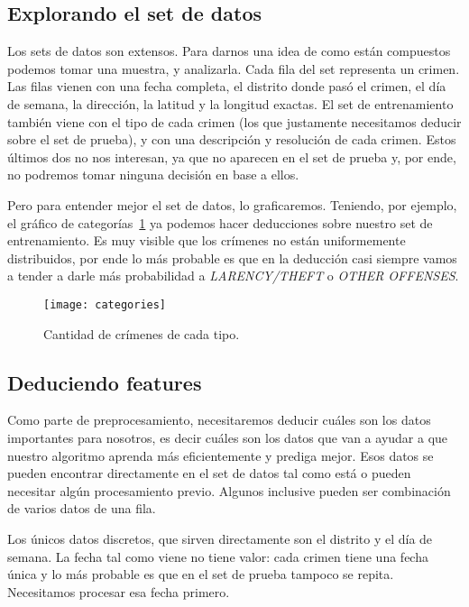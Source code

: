 \subsection{Explorando el set de datos} %
\label{sub:explorando_el_set_de_datos}

Los sets de datos son extensos. Para darnos una idea de como están compuestos podemos tomar una muestra, y analizarla. Cada fila del set representa un crimen. Las filas vienen con una fecha completa, el distrito donde pasó el crimen, el día de semana, la dirección, la latitud y la longitud exactas. El set de entrenamiento también viene con el tipo de cada crimen (los que justamente necesitamos deducir sobre el set de prueba), y con una descripción y resolución de cada crimen. Estos últimos dos no nos interesan, ya que no aparecen en el set de prueba y, por ende, no podremos tomar ninguna decisión en base a ellos.

Pero para entender mejor el set de datos, lo graficaremos. Teniendo, por ejemplo, el gráfico de categorías~\ref{fig:categories} ya podemos hacer deducciones sobre nuestro set de entrenamiento. Es muy visible que los crímenes no están uniformemente distribuidos, por ende lo más probable es que en la deducción casi siempre vamos a tender a darle más probabilidad a \textit{LARENCY/THEFT} o \textit{OTHER OFFENSES}.

\begin{figure}[H]
\texttt{[image: categories]}
\caption{Cantidad de crímenes de cada tipo.}
\label{fig:categories}
\end{figure}


\subsection{Deduciendo features} %
\label{sub:deduciendo_features}

Como parte de preprocesamiento, necesitaremos deducir cuáles son los datos importantes para nosotros, es decir cuáles son los datos que van a ayudar a que nuestro algoritmo aprenda más eficientemente y prediga mejor. Esos datos se pueden encontrar directamente en el set de datos tal como está o pueden necesitar algún procesamiento previo. Algunos inclusive pueden ser combinación de varios datos de una fila.

Los únicos datos discretos, que sirven directamente son el distrito y el día de semana. La fecha tal como viene no tiene valor: cada crimen tiene una fecha única y lo más probable es que en el set de prueba tampoco se repita. Necesitamos procesar esa fecha primero.

